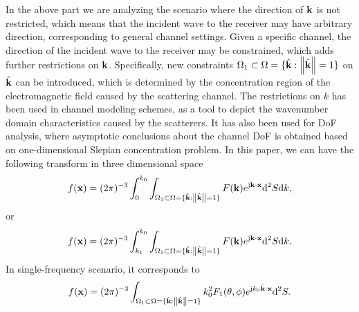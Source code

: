 \documentclass[12pt,draftclsnofoot,journal,onecolumn]{IEEEtran}
\begin{document}
	In the above part we are analyzing the scenario where the direction of ${\bf k}$ is not restricted, which means that the incident wave to the receiver may have arbitrary direction, corresponding to general channel settings. Given a specific channel, the direction of the incident wave to the receiver may be constrained, which adds further restrictions on ${\bf k}$.  Specifically, new constraints ${\Omega}_1 \subset {\Omega}=\{\hat{\bf k}: \left\| \hat{\bf k} \right\|=1\}$ on $\hat{\bf k}$ can be introduced, which is determined by the concentration region of the electromagnetic field caused by the scattering channel. {\color{red} The restrictions on $k$ has been used in channel modeling schemes\cite{pizzo2022fourier}, as a tool to depict the wavenumber domain characteristics caused by the scatterers.
	It has also been used for DoF analysis\cite{poon2005degrees}, where asymptotic conclusions about the channel DoF is obtained based on one-dimensional Slepian concentration problem. } In this paper, we can have the following transform in three dimensional space
	\begin{equation}
		\begin{aligned}
			f({\bf x})=(2\pi)^{-3}\int_0^{k_0} \int_{{\Omega}_1 \subset {\Omega}=\{\hat{\bf k}: \left\| \hat{\bf k} \right\|=1\}} F({\bf k})e^{{\rm j}{\bf k}\cdot {\bf x}}{\rm d}^2S {\rm d}{k},
		\end{aligned}
		\label{eqn_wavenumber_constraint1}
	\end{equation}
	or
	\begin{equation}
		\begin{aligned}
			f({\bf x})=(2\pi)^{-3}\int_{k_1}^{k_0} \int_{{\Omega}_1 \subset {\Omega}=\{\hat{\bf k}: \left\| \hat{\bf k} \right\|=1\}} F({\bf k})e^{{\rm j}{\bf k}\cdot {\bf x}}{\rm d}^2S {\rm d}{k}.
		\end{aligned}
		\label{eqn_wavenumber_constraint2}
	\end{equation}
	In single-frequency scenario, it corresponds to
	\begin{equation}
		\begin{aligned}
			f({\bf x})=(2\pi)^{-3}\int_{{\Omega}_1 \subset {\Omega}=\{\hat{\bf k}: \left\| \hat{\bf k} \right\|=1\}}k_0^2F_1(\theta,\phi)e^{{\rm j}k_0\hat{\bf k}\cdot {\bf x}}{\rm d}^2S.
		\end{aligned}
		\label{eqn_wavenumber_constraint3}
	\end{equation}
	
\end{document}
